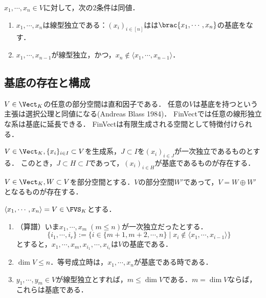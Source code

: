 \documentclass[uplatex, dvipdfmx]{jsreport}
\begin{document}
\begin{proposition}\label{prop-linear-system-expansion}
    $x_1,\cdots,x_n\in V$に対して，次の2条件は同値．
    \begin{enumerate}
        \item $x_1,\cdots,x_n$は線型独立である：$(x_i)_{i\in[n]}$はは$\brac{x_1,\cdots,x_n}$の基底をなす．
        \item $x_1,\cdots,x_{n-1}$が線型独立，かつ，$x_n\notin\langle x_1,\cdots,x_{n-1}\rangle$．
    \end{enumerate}
\end{proposition}


\subsection{基底の存在と構成}

\begin{tcolorbox}[colframe=ForestGreen, colback=ForestGreen!10!white,breakable,colbacktitle=ForestGreen!40!white,coltitle=black,fonttitle=\bfseries\sffamily,
title=]
    $V\in\Vect_K$の任意の部分空間は直和因子である．
    任意の$V$は基底を持つという主張は選択公理と同値になる(Andreas Blass 1984)．
    FinVectでは任意の線形独立な系は基底に延長できる．
    FinVectは有限生成される空間として特徴付けられる．
\end{tcolorbox}

\begin{theorem}[基底の存在定理 (AC)]
    $V\in\Vect_K,\{x_i\}_{i\in I}\subset V$を生成系，$J\subset I$を$(x_i)_{i\in J}$が一次独立であるものとする．
    このとき，$J\subset H\subset I$であって，$(x_i)_{i\in H}$が基底であるものが存在する．
\end{theorem}

\begin{corollary}[補空間の存在]
    $V\in\Vect_K,W\subset V$を部分空間とする．$V$の部分空間$W'$であって，$V=W\oplus W'$となるものが存在する．
\end{corollary}

\begin{theorem}[線型独立系の基底への延長算譜]\label{thm-linear-system-extension-algorithm}
    $\langle x_1,\cdots,x_n\rangle =V\in\FVS_K$とする．
    \begin{enumerate}
        \item （算譜）いま$x_1,\cdots,x_m\;(m\le n)$が一次独立だったとする．
        \[\{i_1,\cdots,i_r\}:=\{i\in \{m+1,m+2,\cdots,n\}\mid x_i\notin\langle x_1,\cdots,x_{i-1}\rangle\}\]
        とすると，$x_1,\cdots,x_m,x_{i_1},\cdots,x_{i_r}$は$V$の基底である．
        \item $\dim V\le n$．等号成立時は，$x_1,\cdots,x_n$が基底である時である．
        \item $y_1,\cdots,y_m\in V$が線型独立とすれば，$m\le\dim V$である．$m=\dim V$ならば，これらは基底である．
    \end{enumerate}
\end{theorem}
\end{document}

